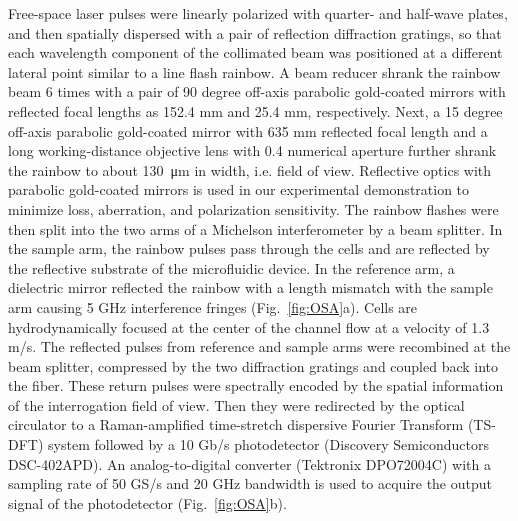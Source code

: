 \documentclass[aps,pra,reprint,superscriptaddress]{revtex4-1}
\begin{document}
Free-space laser pulses were linearly polarized with quarter- and half-wave plates, and then spatially dispersed with a pair of reflection diffraction gratings, so that each wavelength component of the collimated beam was positioned at a different lateral point similar to a line flash rainbow. A beam reducer shrank the rainbow beam 6 times with a pair of 90 degree off-axis parabolic gold-coated mirrors with reflected focal lengths as 152.4 mm and 25.4 mm, respectively. Next, a 15 degree off-axis parabolic gold-coated mirror with 635 mm reflected focal length and a long working-distance objective lens with 0.4 numerical aperture further shrank the rainbow to about \SI{130}{\micro\meter} in width, i.e. field of view. Reflective optics with parabolic gold-coated mirrors is used in our experimental demonstration to minimize loss, aberration, and polarization sensitivity. The rainbow flashes were then split into the two arms of a Michelson interferometer by a beam splitter. In the sample arm, the rainbow pulses pass through the cells and are reflected by the reflective substrate of the microfluidic device. In the reference arm, a dielectric mirror reflected the rainbow with a length mismatch with the sample arm causing 5 GHz interference fringes (Fig.~\ref{fig:OSA}a). Cells are hydrodynamically focused at the center of the channel flow at a velocity of 1.3 m/s. The reflected pulses from reference and sample arms were recombined at the beam splitter, compressed by the two diffraction gratings and coupled back into the fiber. These return pulses were spectrally encoded by the spatial information of the interrogation field of view. Then they were redirected by the optical circulator to a Raman-amplified time-stretch dispersive Fourier Transform (TS-DFT) system followed by a 10 Gb/s photodetector (Discovery Semiconductors DSC-402APD). An analog-to-digital converter (Tektronix DPO72004C) with a sampling rate of 50 GS/s and 20 GHz bandwidth is used to acquire the output signal of the photodetector (Fig.~\ref{fig:OSA}b).
\end{document}
